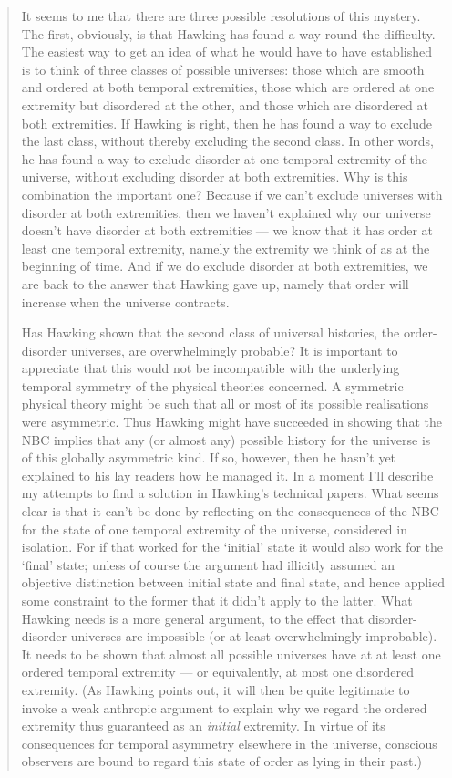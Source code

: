 \documentclass[12pt]{article}
\begin{document}
\begin{quote}
It seems to me that there are three possible resolutions of this
mystery. The first, obviously, is that Hawking has found a way round the
difficulty. The easiest way to get an idea of what he would have to have
established is to think of three classes of possible universes: those
which are smooth and ordered at both temporal extremities, those which
are ordered at one extremity but disordered at the other, and those
which are disordered at both extremities. If Hawking is right, then he
has found a way to exclude the last class, without thereby excluding the
second class. In other words, he has found a way to exclude disorder at
one temporal extremity of the universe, without excluding disorder at
both extremities. Why is this combination the important one? Because if
we can't exclude universes with disorder at both extremities, then we
haven't explained why our universe doesn't have disorder at both
extremities --- we know that it has order at least one temporal
extremity, namely the extremity we think of as at the beginning of time.
And if we do exclude disorder at both extremities, we are back to the
answer that Hawking gave up, namely that order will increase when the
universe contracts.

Has Hawking shown that the second class of universal histories, the
order-disorder universes, are overwhelmingly probable? It is important
to appreciate that this would not be incompatible with the underlying
temporal symmetry of the physical theories concerned. A symmetric
physical theory might be such that all or most of its possible
realisations were asymmetric. Thus Hawking might have succeeded in
showing that the NBC implies that any (or almost any) possible history
for the universe is of this globally asymmetric kind. If so, however,
then he hasn't yet explained to his lay readers how he managed it. In a
moment I'll describe my attempts to find a solution in Hawking's
technical papers. What seems clear is that it can't be done by
reflecting on the consequences of the NBC for the state of one temporal
extremity of the universe, considered in isolation. For if that worked
for the `initial' state it would also work for the `final' state; unless
of course the argument had illicitly assumed an objective distinction
between initial state and final state, and hence applied some constraint
to the former that it didn't apply to the latter. What Hawking needs is
a more general argument, to the effect that disorder-disorder universes
are impossible (or at least overwhelmingly improbable). It needs to be
shown that almost all possible universes have at at least one ordered
temporal extremity --- or equivalently, at most one disordered
extremity. (As Hawking points out, it will then be quite legitimate to
invoke a weak anthropic argument to explain why we regard the ordered
extremity thus guaranteed as an \emph{initial} extremity. In virtue of
its consequences for temporal asymmetry elsewhere in the universe,
conscious observers are bound to regard this state of order as lying in
their past.)


\end{quote}
\end{document}
